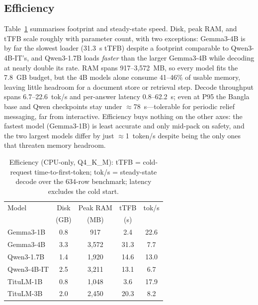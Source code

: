 \documentclass[conference]{IEEEtran}
\begin{document}
\subsection{Efficiency}
Table~\ref{tab:eff} summarises footprint and steady-state speed. Disk, peak RAM, and tTFB scale roughly with
parameter count, with two exceptions: Gemma3-4B is by far the slowest loader (31.3~s tTFB) despite a
footprint comparable to Qwen3-4B-IT's, and Qwen3-1.7B loads \emph{faster} than the larger Gemma3-4B while
decoding at nearly double its rate. RAM spans 917--3{,}572~MB, so every model fits the 7.8~GB budget, but the 4B
models alone consume 41--46\% of usable memory, leaving little headroom for a document store or retrieval step.
Decode throughput spans 6.7--22.6~tok/s and per-answer latency 0.8--62.2~s; even at P95 the Bangla base and Qwen
checkpoints stay under $\approx$78~s---tolerable for periodic relief messaging, far from interactive. Efficiency buys
nothing on the other axes: the fastest model (Gemma3-1B) is least accurate and only mid-pack on safety, and the
two largest models differ by just $\approx$1~token/s despite being the only ones that threaten memory headroom.

\begin{table}[t]
\caption{Efficiency (CPU-only, Q4\_K\_M): tTFB = cold-request time-to-first-token; tok/s =
steady-state decode over the 634-row benchmark; latency excludes the cold start.}
\label{tab:eff}
\centering
{\footnotesize
\setlength{\tabcolsep}{4pt}
\begin{tabular}{lcccc}
\toprule
Model & Disk & Peak RAM & tTFB & tok/s \\
 & (GB) & (MB) & (s) & \\
\midrule
Gemma3-1B   & 0.8 & 917 & 2.4 & 22.6 \\
Gemma3-4B   & 3.3 & 3{,}572 & 31.3 & 7.7 \\
Qwen3-1.7B  & 1.4 & 1{,}920 & 14.6 & 13.0 \\
Qwen3-4B-IT & 2.5 & 3{,}211 & 13.1 & 6.7 \\
TituLM-1B   & 0.8 & 1{,}048 & 3.6 & 17.9 \\
TituLM-3B   & 2.0 & 2{,}450 & 20.3 & 8.2 \\
\bottomrule
\end{tabular}}
\end{table}
\end{document}
